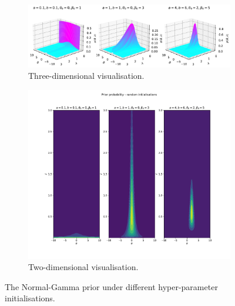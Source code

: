 \documentclass{article}
\begin{document}
\begin{figure}[htb!]
     \centering
     \begin{subfigure}[b]{0.7\textwidth}
         \centering
         \includegraphics[width=\textwidth]{Q1b_1.pdf}
         \caption{Three-dimensional visualisation.}
     \end{subfigure}
     
     \begin{subfigure}[b]{0.7\textwidth}
         \centering
         \includegraphics[width=\textwidth]{Q1b_2.pdf}
         \caption{Two-dimensional visualisation.}
     \end{subfigure}
     
     \caption{The Normal-Gamma prior under different hyper-parameter initialisations.}
     \label{fig:Q1b_prior}
\end{figure}
\end{document}
